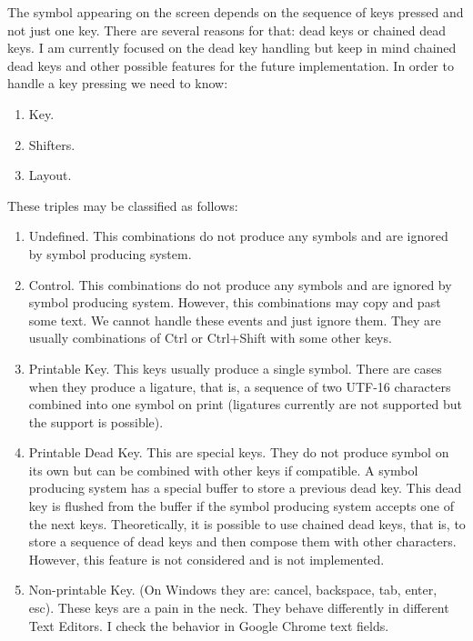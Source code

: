 \documentclass{article}
\begin{document}
The symbol appearing on the screen depends on the sequence of keys pressed and not just one key. There are several reasons for that: dead keys or chained dead keys. I am currently focused on the dead key handling but keep in mind chained dead keys and other possible features for the future implementation. In order to handle a key pressing we need to know:
\begin{enumerate}
\item Key.
\item Shifters.
\item Layout.
\end{enumerate}

These triples may be classified as follows:
\begin{enumerate}
\item Undefined. This combinations do not produce any symbols and are ignored by symbol producing system.
\item Control. This combinations do not produce any symbols and are ignored by symbol producing system. However, this combinations may copy and past some text. We cannot handle these events and just ignore them. They are usually combinations of Ctrl or Ctrl+Shift with some other keys.

\item Printable Key. This keys usually produce a single symbol. There are cases when they produce a ligature, that is, a sequence of two UTF-16 characters combined into one symbol on print (ligatures currently are not supported but the support is possible).
\item Printable Dead Key. This are special keys. They do not produce symbol on its own but can be combined with other keys if compatible. A symbol producing system has a special buffer to store a previous dead key. This dead key is flushed from the buffer if the symbol producing system accepts one of the next keys. Theoretically, it is possible to use chained dead keys, that is, to store a sequence of dead keys and then compose them with other characters. However, this feature is not considered and is not implemented.
\item Non-printable Key. (On Windows they are: cancel, backspace, tab, enter, esc). These keys are a pain in the neck. They behave differently in different Text Editors. I check the behavior in Google Chrome text fields.
\end{enumerate}
\end{document}
